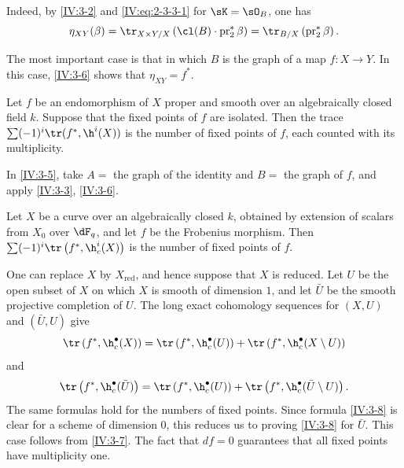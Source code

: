 \documentclass[oneside]{book}
\begin{document}
Indeed, by \ref{IV:3-2} and \eqref{IV:eq:2-3-3-1} for $\sK=\sO_B$, one has
\[
  \eta_{X Y}(\beta) = \tr_{X\times Y/X}\left(\cl(B)\cdot \operatorname{pr}_2^\ast\beta\right) = \tr_{B/X}\left(\operatorname{pr}_2^\ast \beta\right) \text{.}
\]

The most important case is that in which $B$ is the graph of a map
$f:X\to Y$. In this case, \ref{IV:3-6} shows that $\eta_{X Y}=f^\ast$.






\begin{corollary_}\label{IV:3-7}
Let $f$ be an endomorphism of $X$ proper and smooth over an algebraically
closed field $k$. Suppose that the fixed points of $f$ are isolated. Then the
trace $\sum (-1)^i \tr(f^\ast,\h^i(X))$ is the number of fixed points of $f$,
each counted with its multiplicity.
\end{corollary_}

In \ref{IV:3-5}, take $A=$ the graph of the identity and $B=$ the graph of
$f$, and apply \ref{IV:3-3}, \ref{IV:3-6}.






\begin{corollary_}\label{IV:3-8}
Let $X$ be a curve over an algebraically closed $k$, obtained by extension of
scalars from $X_0$ over $\dF_q$, and let $f$ be the Frobenius morphism. Then
$\sum (-1)^i \tr\left(f^\ast,\h_c^i(X)\right)$ is the number of fixed
points of $f$.
\end{corollary_}

One can replace $X$ by $X_\text{red}$, and hence suppose that $X$ is reduced.
Let $U$ be the open subset of $X$ on which $X$ is smooth of dimension $1$,
and let $\bar U$ be the smooth projective completion of $U$. The long exact
cohomology sequences for $(X,U)$ and $(\bar U,U)$ give
\[
  \tr\left(f^\ast,\h_c^\bullet(X)\right) = \tr\left(f^\ast,\h_c^\bullet(U)\right) + \tr\left(f^\ast,\h_c^\bullet(X\setminus U)\right)
\]
and
\[
  \tr\left(f^\ast,\h_c^\bullet(\bar U)\right) = \tr\left(f^\ast,\h_c^\bullet(U)\right) + \tr\left(f^\ast,\h_c^\bullet(\bar U\setminus U)\right) \text{.}
\]
The same formulas hold for the numbers of fixed points. Since formula
\ref{IV:3-8} is clear for a scheme of dimension $0$, this reduces us to
proving \ref{IV:3-8} for $\bar U$. This case follows from \ref{IV:3-7}. The
fact that $d f=0$ guarantees that all fixed points have multiplicity one.
\end{document}

